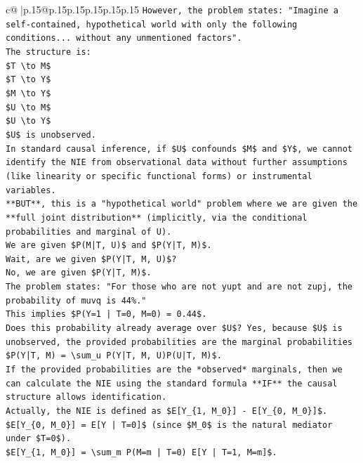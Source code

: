 \documentclass{article}
\begin{document}
{\begin{supertabular}{c@{$\;$}|p{.15\linewidth}@{}p{.15\linewidth}p{.15\linewidth}p{.15\linewidth}p{.15\linewidth}p{.15\linewidth}}
{{{\texttt{However, the problem states: "Imagine a self{-}contained, hypothetical world with only the following conditions... without any unmentioned factors".} \\
\texttt{The structure is:} \\
\texttt{\$T \textbackslash{}to M\$} \\
\texttt{\$T \textbackslash{}to Y\$} \\
\texttt{\$M \textbackslash{}to Y\$} \\
\texttt{\$U \textbackslash{}to M\$} \\
\texttt{\$U \textbackslash{}to Y\$} \\
\texttt{\$U\$ is unobserved.} \\
\texttt{In standard causal inference, if \$U\$ confounds \$M\$ and \$Y\$, we cannot identify the NIE from observational data without further assumptions (like linearity or specific functional forms) or instrumental variables.} \\
\texttt{**BUT**, this is a "hypothetical world" problem where we are given the **full joint distribution** (implicitly, via the conditional probabilities and marginal of U).} \\
\texttt{We are given \$P(M|T, U)\$ and \$P(Y|T, M)\$.} \\
\texttt{Wait, are we given \$P(Y|T, M, U)\$?} \\
\texttt{No, we are given \$P(Y|T, M)\$.} \\
\texttt{The problem states: "For those who are not yupt and are not zupj, the probability of muvq is 44\%."} \\
\texttt{This implies \$P(Y=1 | T=0, M=0) = 0.44\$.} \\
\texttt{Does this probability already average over \$U\$? Yes, because \$U\$ is unobserved, the provided probabilities are the marginal probabilities \$P(Y|T, M) = \textbackslash{}sum\_u P(Y|T, M, U)P(U|T, M)\$.} \\
\texttt{If the provided probabilities are the *observed* marginals, then we can calculate the NIE using the standard formula **IF** the causal structure allows identification.} \\
\texttt{Actually, the NIE is defined as \$E{[}Y\_\{1, M\_0\}{]} {-} E{[}Y\_\{0, M\_0\}{]}\$.} \\
\texttt{\$E{[}Y\_\{0, M\_0\}{]} = E{[}Y | T=0{]}\$ (since \$M\_0\$ is the natural mediator under \$T=0\$).} \\
\texttt{\$E{[}Y\_\{1, M\_0\}{]} = \textbackslash{}sum\_m P(M=m | T=0) E{[}Y | T=1, M=m{]}\$.} \\
}}}
\end{supertabular}}
\end{document}
